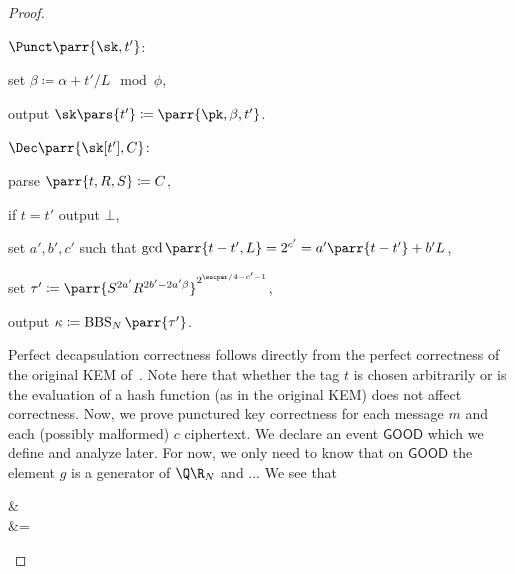 \begin{proof}
\begin{sitemize}
        \item \(\Punct\parr{\sk,t'}\):
        \begin{sitemize}
            \item set \(\beta \coloneqq \alpha + t'/L \mod \phi\),
            \item output \(\sk\pars{t'} \coloneqq \parr{\pk,\beta,t'}\).
        \end{sitemize}
        \item \(\Dec\parr{\sk[t'],C}\):
        \begin{sitemize}
            \item parse \(\parr{t,R,S} \coloneqq C\),
            \item if \(t = t'\) output \(\bot\),
            \item set \(a',b',c'\) such that \(\gcd\parr{t-t',L} = 2^{c'} = a' \parr{t-t'} + b' L\),
            \item set \(\tau' \coloneqq \parr{S^{2a'} R^{2b'-2a'\beta}}^{2^{\secpar/4-c'-1}}\),
            \item output \(\kappa \coloneqq \operatorname{BBS}_N\parr{\tau'}\).
        \end{sitemize}
    \end{sitemize}
    Perfect decapsulation correctness follows directly from the perfect correctness of the original KEM of~\cite{EC:HofKil09}.
    Note here that whether the tag \(t\) is chosen arbitrarily or is the evaluation of a hash function (as in the original KEM) does not affect correctness.
    Now, we prove punctured key correctness for each message \(m\) and each (possibly malformed) \(c\) ciphertext.
    We declare an event \(\textsf{GOOD}\) which we define and analyze later.
    For now, we only need to know that on \(\textsf{GOOD}\) the element \(g\) is a generator of \(\Q\R_N\) and ...
    We see that
    \begin{bralign}
        &
        \\
        &=

\end{bralign}
\end{proof}
